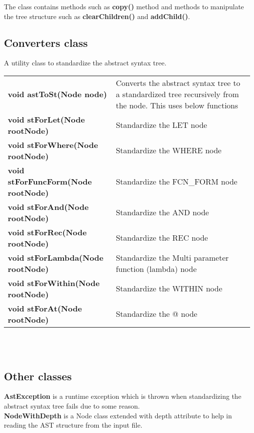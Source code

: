 \documentclass[12pt,a4paper]{article}
\begin{document}
The class contains methods such as \textbf{copy()} method and methods to manipulate the tree structure such as \textbf{clearChildren()} and \textbf{addChild()}. \\

\subsection{Converters class}

A utility class to standardize the abstract syntax tree. \\

\begin{tabular}{lp{9cm}}
    \textbf{void astToSt(Node node)} & Converts the abstract syntax tree to a standardized tree recursively from the node. This uses below functions \\
    \textbf{void stForLet(Node rootNode)} & Standardize the LET node\\
    \textbf{void stForWhere(Node rootNode)} & Standardize the WHERE node\\
    \textbf{void stForFuncForm(Node rootNode)} & Standardize the FCN\_FORM node\\
    \textbf{void stForAnd(Node rootNode)} & Standardize the AND node\\
    \textbf{void stForRec(Node rootNode)} & Standardize the REC node\\
    \textbf{void stForLambda(Node rootNode)} & Standardize the Multi parameter function (lambda) node\\
    \textbf{void stForWithin(Node rootNode)} & Standardize the WITHIN node\\
    \textbf{void stForAt(Node rootNode)} & Standardize the @ node\\
\end{tabular} \\ \\

\subsection{Other classes}

\textbf{AstException} is a runtime exception which is thrown when standardizing the abstract syntax tree fails due to some reason.\\

\textbf{NodeWithDepth} is a Node class extended with depth attribute to help in reading the AST structure from the input file.\\
\end{document}
